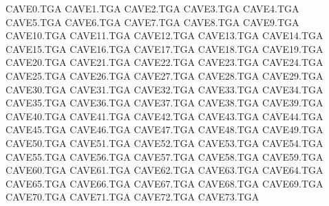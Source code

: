 CAVE0.TGA
CAVE1.TGA
CAVE2.TGA
CAVE3.TGA
CAVE4.TGA
CAVE5.TGA
CAVE6.TGA
CAVE7.TGA
CAVE8.TGA
CAVE9.TGA
CAVE10.TGA
CAVE11.TGA
CAVE12.TGA
CAVE13.TGA
CAVE14.TGA
CAVE15.TGA
CAVE16.TGA
CAVE17.TGA
CAVE18.TGA
CAVE19.TGA
CAVE20.TGA
CAVE21.TGA
CAVE22.TGA
CAVE23.TGA
CAVE24.TGA
CAVE25.TGA
CAVE26.TGA
CAVE27.TGA
CAVE28.TGA
CAVE29.TGA
CAVE30.TGA
CAVE31.TGA
CAVE32.TGA
CAVE33.TGA
CAVE34.TGA
CAVE35.TGA
CAVE36.TGA
CAVE37.TGA
CAVE38.TGA
CAVE39.TGA
CAVE40.TGA
CAVE41.TGA
CAVE42.TGA
CAVE43.TGA
CAVE44.TGA
CAVE45.TGA
CAVE46.TGA
CAVE47.TGA
CAVE48.TGA
CAVE49.TGA
CAVE50.TGA
CAVE51.TGA
CAVE52.TGA
CAVE53.TGA
CAVE54.TGA
CAVE55.TGA
CAVE56.TGA
CAVE57.TGA
CAVE58.TGA
CAVE59.TGA
CAVE60.TGA
CAVE61.TGA
CAVE62.TGA
CAVE63.TGA
CAVE64.TGA
CAVE65.TGA
CAVE66.TGA
CAVE67.TGA
CAVE68.TGA
CAVE69.TGA
CAVE70.TGA
CAVE71.TGA
CAVE72.TGA
CAVE73.TGA